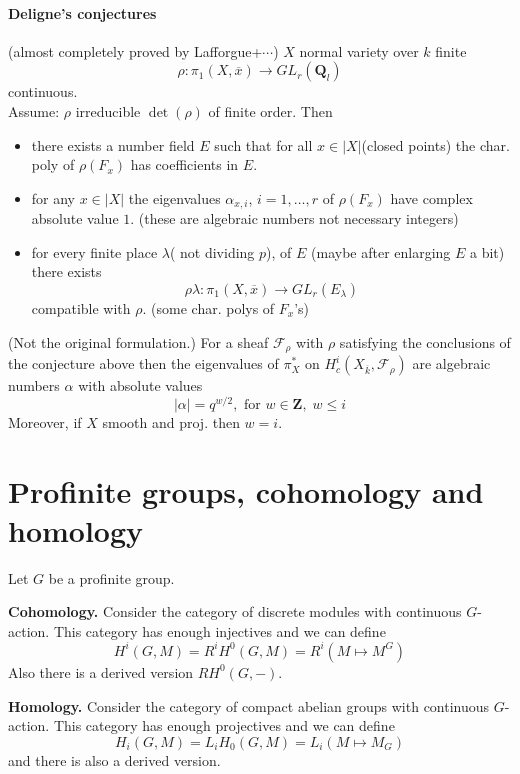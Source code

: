 \paragraph{Deligne's conjectures}(almost completely proved by 
Lafforgue+$\cdots$) $X$ normal variety over $k$ finite
	$$\rho: \pi_1(X, \overline x)\to GL_r(\mathbf{Q}_l) $$
	continuous.\\
Assume: $\rho$ irreducible $\det(\rho)$ of finite order. Then 
	\begin{itemize}
	\item there exists a number field $E$ such that for all $x\in 
|X|$(closed points) the char. poly of $\rho(F_x)$ has coefficients in $E$. 
	\item for any $x\in |X|$ the eigenvalues $\alpha_{x, i}$, $i=1, \ldots, 
r$ of $\rho(F_x)$ have complex absolute value $1$. 
	(these are algebraic numbers not necessary integers)
	\item for every finite place $\lambda$( not dividing $p$), of $E$ 
(maybe after enlarging $E$ a bit) there exists 
	$$\rho\lambda: \pi_1(X, \overline x) \to GL_r(E_\lambda)$$
	compatible with $\rho$. (some char. polys of  $F_x$'s)
	\end{itemize}

\begin{theorem} (Not the original formulation.) For a sheaf 
$\mathcal{F}_\rho$ with $\rho$ satisfying the conclusions of the conjecture 
above then the eigenvalues of $\pi_X^*$ on $H_c^i(X_{\overline k}, 
\mathcal{F}_{\rho})$ are algebraic numbers $\alpha$ with absolute values
	$$|\alpha|=q^{w/2}, \text{ for }w\in \mathbf{Z}, \; w\leq i$$
	Moreover, if $X$ smooth and proj. then $w=i$.
\end{theorem}


\section{Profinite groups, cohomology and homology}
\label{section-profinite-cohomology}

\noindent
Let $G$ be a profinite group.

\medskip\noindent
{\bf Cohomology.}
Consider the category of discrete modules with continuous $G$-action.
This category has enough injectives and we can define
$$
H^i(G, M) = R^iH^0(G, M) = R^i(M\mapsto M^G)
$$
Also there is a derived version $RH^0(G, -)$.

\medskip\noindent
{\bf Homology.}
Consider the category of compact abelian groups with continuous $G$-action.
This category has enough projectives and we can define
$$
H_i(G, M) = L_iH_0(G, M)=L_i(M\mapsto M_G)
$$
and there is also a derived version.

